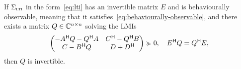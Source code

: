 \begin{lemma}\label{lem:kyp-invertible-solution}
    If $\Sigma_{\textnormal{\scshape lti}}$ in the form~\eqref{eq:lti} has an invertible matrix $E$ and is behaviourally observable, meaning that it satisfies~\eqref{eq:behaviourally-observable}, and there exists a matrix $Q \in \mathbb{C}^{n \times n}$ solving the LMIs
    \begin{equation*}
        \begin{pmatrix}
            -A^{\mkern1mu \mathsf{H}} Q - Q^{\mkern1mu \mathsf{H}} A & C^{\mkern1mu \mathsf{H}} - Q^{\mkern1mu \mathsf{H}} B \\
            C - B^{\mkern1mu \mathsf{H}} Q & D + D^{\mkern1mu \mathsf{H}}
        \end{pmatrix} \succcurlyeq 0,\quad E^{\mkern1mu \mathsf{H}} Q = Q^{\mkern1mu \mathsf{H}} E,
    \end{equation*}
    then $Q$ is invertible.
\end{lemma}

